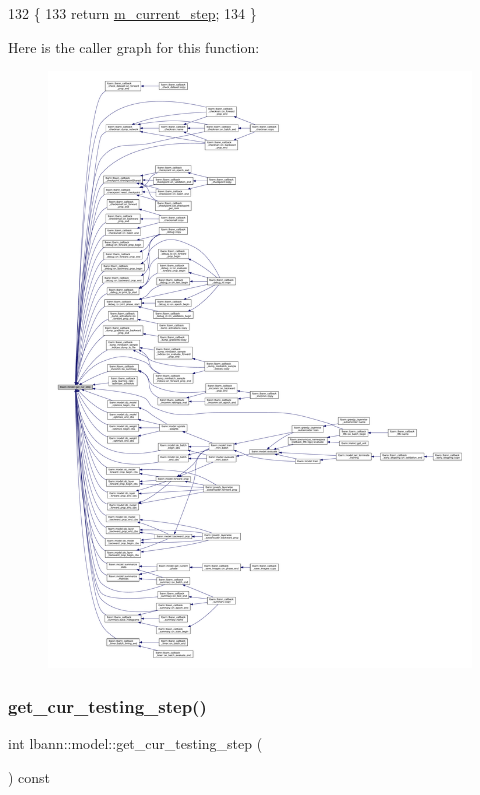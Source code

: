 \begin{DoxyCode}
132                                   \{
133     \textcolor{keywordflow}{return} \hyperlink{classlbann_1_1model_af31a76afc53061747d2170a65e98f692}{m\_current\_step};  
134   \}
\end{DoxyCode}
Here is the caller graph for this function\+:\nopagebreak
\begin{figure}[H]
\begin{center}
\leavevmode
\includegraphics[width=350pt]{classlbann_1_1model_ad0cdcba177434b52dc9c4a97be183a92_icgraph}
\end{center}
\end{figure}
\mbox{\label{classlbann_1_1model_a4040b1f06a2a5d5187a72c06060124c1}} 
\subsubsection{\texorpdfstring{get\+\_\+cur\+\_\+testing\+\_\+step()}{get\_cur\_testing\_step()}}
{\footnotesize\ttfamily int lbann\+::model\+::get\+\_\+cur\+\_\+testing\+\_\+step (\begin{DoxyParamCaption}{ }\end{DoxyParamCaption}) const\hspace{0.3cm}{\ttfamily [inline]}}

